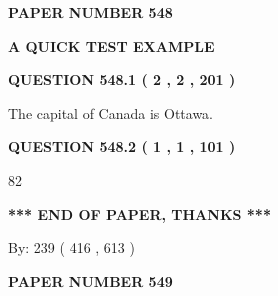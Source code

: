 \documentclass[12pt]{article}
\begin{document}
   
   
   
\newpage 
\setcounter{page}{ 
   548001 } 
   
   
   
   
 {\textbf{ \Large{ PAPER NUMBER  548  }}}
   
   
\vspace{0.2in}
   
   
   
   
   
   
 \vspace{0.2in}
{\LARGE {\textbf{ A QUICK TEST EXAMPLE}}}
   
   
  
\vspace{0.2in}
  
{\textbf{\Large{QUESTION
548.1 
 ( 2 , 2 , 201 )
}}}
  
  
 
 
\noindent{}
 
 
The capital of Canada is Ottawa.
 
 
 
 
  
\vspace{0.2in}
  
{\textbf{\Large{QUESTION
548.2 
 ( 1 , 1 , 101 )
}}}
  
  
 
 
\noindent{}

82
 
 
   
   
 \vspace{0.2in}
 
   
   
   
   
\vspace{1.0in} 
{\textbf{\large{ *** END OF PAPER, THANKS *** }}} 
   
   
\hspace{1.0in} By: 
 239 ( 416 ,  613 )
   
   
   
   
\newpage 
\setcounter{page}{ 
   549001 } 
   
   
   
   
 {\textbf{ \Large{ PAPER NUMBER  549  }}}
   
\end{document}
